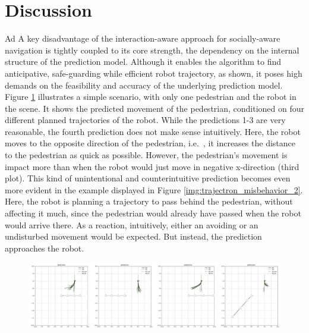 \section{Discussion}
\label{text:experiments/discussion}
Ad 
\newline
A key disadvantage of the interaction-aware approach for socially-aware navigation is tightly coupled to its core strength, the dependency on the internal structure of the prediction model. Although it enables the algorithm to find anticipative, safe-guarding while efficient robot trajectory, as shown, it poses high demands on the feasibility and accuracy of the underlying prediction model. Figure \ref{img:trajectron_misbehavior} illustrates a simple scenario, with only one pedestrian and the robot in the scene. It shows the predicted movement of the pedestrian, conditioned on four different planned trajectories of the robot. While the predictions 1-3 are very reasonable, the fourth prediction does not make sense intuitively. Here, the robot moves to the opposite direction of the pedestrian, i.e.\ , it increases the distance to the pedestrian as quick as possible. However, the pedestrian's movement is impact more than when the robot would just move in negative x-direction (third plot). This kind of unintentional and counterintuitive prediction becomes even more evident in the example displayed in Figure \ref{img:trajectron_misbehavior_2}. Here, the robot is planning a trajectory to pass behind the pedestrian, without affecting it much, since the pedestrian would already have passed when the robot would arrive there. As a reaction, intuitively, either an avoiding or an undisturbed movement would be expected. But instead, the prediction approaches the robot. 

\begin{figure}[!ht]
\begin{center}
\includegraphics[width=\textwidth]{images/trajectron_misbehavior.png}
\label{img:trajectron_misbehavior}
\end{center}
\end{figure}

